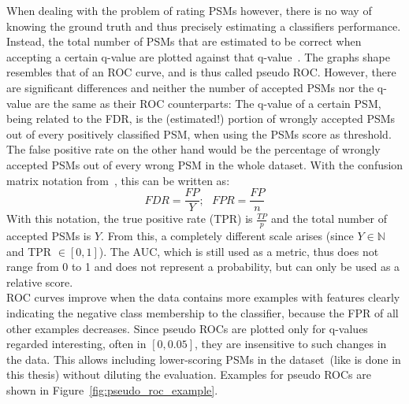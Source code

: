 	When dealing with the problem of rating PSMs however, there is no way of knowing the ground truth and thus precisely estimating a classifiers performance. Instead, the total number of PSMs that are estimated to be correct when accepting a certain q-value are plotted against that q-value~\cite{Kll2007, Granholm2012}. The graphs shape resembles that of an ROC curve, and is thus called pseudo ROC. However, there are significant differences and neither the number of accepted PSMs nor the q-value are the same as their ROC counterparts: The q-value of a certain PSM, being related to the FDR, is the (estimated!) portion of wrongly accepted PSMs out of every positively classified PSM, when using the PSMs score as threshold. The false positive rate on the other hand would be the percentage of wrongly accepted PSMs out of every wrong PSM in the whole dataset. With the confusion matrix notation from~\citet{Fawcett2006}, this can be written as:\\
	\begin{equation}
		FDR = \frac{FP}{Y};~~~ FPR = \frac{FP}{n}
	\end{equation}
	With this notation, the true positive rate (TPR) is $\frac{TP}{p}$ and the total number of accepted PSMs is $Y$. From this, a completely different scale arises (since $Y \in \mathbb{N}$ and TPR $\in [0,1]$). The AUC, which is still used as a metric, thus does not range from 0 to 1 and does not represent a probability, but can only be used as a relative score.\\
	ROC curves improve when the data contains more examples with features clearly indicating the negative class membership to the classifier, because the FPR of all other examples decreases. Since pseudo ROCs are plotted only for q-values regarded interesting, often in $[0,0.05]$, they are insensitive to such changes in the data. This allows including lower-scoring PSMs in the dataset~(like is done in this thesis) without diluting the evaluation. Examples for pseudo ROCs are shown in Figure~\ref{fig:pseudo_roc_example}.
	\renewcommand{\baselinestretch}{0.9}
